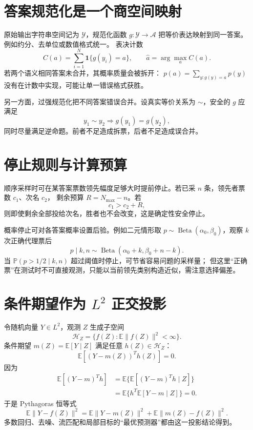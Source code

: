 \documentclass[11pt]{article}
\numberwithin{equation}{section}
\newcommand{\E}{\mathbb{E}}
\newcommand{\Pp}{\mathbb{P}}
\newcommand{\1}{\mathbf{1}}
\begin{document}
\section{答案规范化是一个商空间映射}

原始输出字符串空间记为 $\mathcal Y$，规范化函数
$g:\mathcal Y\to\mathcal A$ 把等价表达映射到同一答案。例如约分、去单位或数值格式统一。
表决计数
\begin{equation}
 C(a)=\sum_{i=1}^{N}\1\{g(y_i)=a\},\qquad
 \widehat a=\arg\max_aC(a).
\end{equation}
若两个语义相同答案未合并，其概率质量会被拆开：
$p(a)=\sum_{y:g(y)=a}p(y)$ 没有在计数中实现，可能让单一错误格式获胜。

另一方面，过强规范化把不同答案错误合并。设真实等价关系为 $\sim$，安全的 $g$ 应满足
\begin{equation}
 y_1\sim y_2\Rightarrow g(y_1)=g(y_2),
\end{equation}
同时尽量满足逆命题。前者不足造成拆票，后者不足造成误合并。

\section{停止规则与计算预算}

顺序采样时可在某答案票数领先幅度足够大时提前停止。若已采 $n$ 条，领先者票数 $c_1$、次名 $c_2$，
剩余预算 $R=N_{\max}-n$。若
\begin{equation}
 c_1>c_2+R,
\end{equation}
则即使剩余全部投给次名，胜者也不会改变，这是确定性安全停止。

概率停止可对各答案概率设置后验。例如二元情形取
$p\sim\operatorname{Beta}(\alpha_0,\beta_0)$，观察 $k$ 次正确代理票后
\begin{equation}
 p\mid k,n\sim\operatorname{Beta}(\alpha_0+k,\beta_0+n-k).
\end{equation}
当 $\Pp(p>1/2\mid k,n)$ 超过阈值时停止，可节省容易问题的采样量；
但这里“正确票”在测试时不可直接观测，只能以当前领先类别构造近似，需注意选择偏差。

\section{条件期望作为 $L^2$ 正交投影}

令随机向量 $Y\in L^2$，观测 $Z$ 生成子空间
\begin{equation}
 \mathcal H_Z=\{f(Z):\E\|f(Z)\|^2<\infty\}.
\end{equation}
条件期望 $m(Z)=\E[Y\mid Z]$ 满足任意 $h(Z)\in\mathcal H_Z$：
\begin{equation}
 \E[(Y-m(Z))^Th(Z)]=0.
\end{equation}
因为
\begin{align}
 \E[(Y-m)^Th]
 &=\E\{\E[(Y-m)^Th\mid Z]\}\\
 &=\E\{h^T\E[Y-m\mid Z]\}=0.
\end{align}
于是 Pythagoras 恒等式
\begin{equation}
 \E\|Y-f(Z)\|^2
 =\E\|Y-m(Z)\|^2+\E\|m(Z)-f(Z)\|^2.
\end{equation}
多数回归、去噪、流匹配和局部目标的“最优预测器”都由这一投影结论得到。
\end{document}
